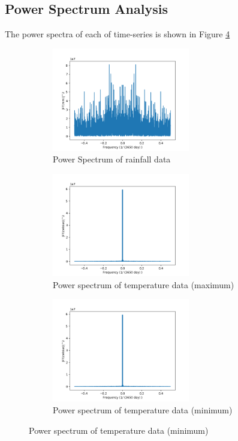 \documentclass{article}
\begin{document}
\subsection{Power Spectrum Analysis}
The power spectra of each of time-series is shown in Figure \ref{fig:spectrum_analysis}
\begin{figure}[h!]
	\caption{Power spectra of each dataset}
	\begin{subfigure}{\textwidth}
		\includegraphics[width=\linewidth, height=4.5cm]{figures/power_spectrum_rainfall.png} 
		\caption{Power Spectrum of rainfall data}
		\label{fig:power_spectrum_rainfall}
	\end{subfigure}
	\begin{subfigure}{\textwidth}
		\includegraphics[width=\linewidth, height=4.5cm]{figures/power_spectrum_max_temp.png}
		\caption{Power spectrum of temperature data (maximum)}	
		\label{fig:power_spectrum_max_temp}
	\end{subfigure}
	\begin{subfigure}{\textwidth}
		\includegraphics[width=\linewidth, height=4.5cm]{figures/power_spectrum_max_temp.png}
		\caption{Power spectrum of temperature data (minimum)}	
		\label{fig:power_spectrum_min_temp}
	\end{subfigure}
	\label{fig:spectrum_analysis}
\end{figure}
\end{document}
